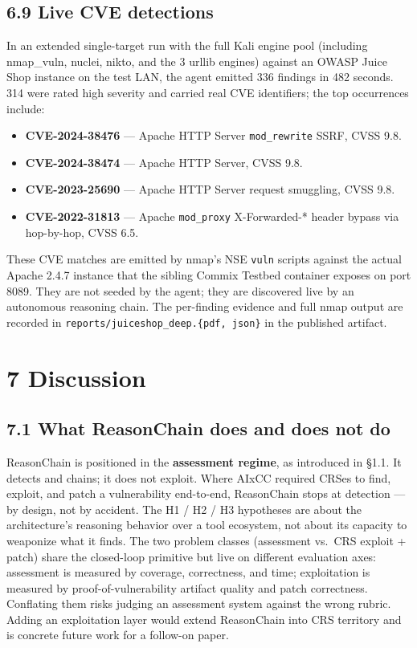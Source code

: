 \documentclass[
]{article}
\providecommand{\tightlist}{%
  \setlength{\itemsep}{0pt}\setlength{\parskip}{0pt}}
\begin{document}
\subsection{6.9 Live CVE detections}\label{live-cve-detections}

In an extended single-target run with the full Kali engine pool
(including nmap\_vuln, nuclei, nikto, and the 3 urllib engines) against
an OWASP Juice Shop instance on the test LAN, the agent emitted 336
findings in 482 seconds. 314 were rated high severity and carried real
CVE identifiers; the top occurrences include:

\begin{itemize}
\tightlist
\item
  \textbf{CVE-2024-38476} --- Apache HTTP Server \texttt{mod\_rewrite}
  SSRF, CVSS 9.8.
\item
  \textbf{CVE-2024-38474} --- Apache HTTP Server, CVSS 9.8.
\item
  \textbf{CVE-2023-25690} --- Apache HTTP Server request smuggling, CVSS
  9.8.
\item
  \textbf{CVE-2022-31813} --- Apache \texttt{mod\_proxy} X-Forwarded-*
  header bypass via hop-by-hop, CVSS 6.5.
\end{itemize}

These CVE matches are emitted by nmap's NSE \texttt{vuln} scripts
against the actual Apache 2.4.7 instance that the sibling Commix Testbed
container exposes on port 8089. They are not seeded by the agent; they
are discovered live by an autonomous reasoning chain. The per-finding
evidence and full nmap output are recorded in
\texttt{reports/juiceshop\_deep.\{pdf,\ json\}} in the published
artifact.

\section{7 Discussion}\label{discussion}

\subsection{7.1 What ReasonChain does and does not
do}\label{what-reasonchain-does-and-does-not-do}

ReasonChain is positioned in the \textbf{assessment regime}, as
introduced in §1.1. It detects and chains; it does not exploit. Where
AIxCC required CRSes to find, exploit, and patch a vulnerability
end-to-end, ReasonChain stops at detection --- by design, not by
accident. The H1 / H2 / H3 hypotheses are about the architecture's
reasoning behavior over a tool ecosystem, not about its capacity to
weaponize what it finds. The two problem classes (assessment vs.~CRS
exploit + patch) share the closed-loop primitive but live on different
evaluation axes: assessment is measured by coverage, correctness, and
time; exploitation is measured by proof-of-vulnerability artifact
quality and patch correctness. Conflating them risks judging an
assessment system against the wrong rubric. Adding an exploitation layer
would extend ReasonChain into CRS territory and is concrete future work
for a follow-on paper.
\end{document}
